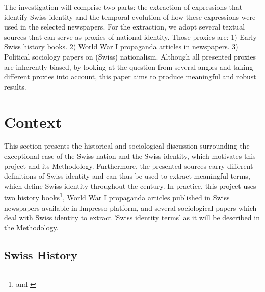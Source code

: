 \documentclass[11pt]{article}
\begin{document}
The investigation will comprise two parts: the extraction of expressions that identify Swiss identity and the temporal evolution of how these expressions were used in the selected newspapers. For the extraction, we adopt several textual sources that can serve as proxies of national identity. Those proxies are: 1) Early Swiss history books. 2) World War I propaganda articles in newspapers. 3) Political sociology papers on (Swiss) nationalism. Although all presented proxies are inherently biased, by looking at the question from several angles and taking different proxies into account, this paper aims to produce meaningful and robust results. 

\section{Context}

This section presents the historical and sociological discussion surrounding the exceptional case of the Swiss nation and the Swiss identity, which motivates this project and its Methodology. Furthermore, the presented sources carry different definitions of Swiss identity and can thus be used to extract meaningful terms, which define Swiss identity throughout the century. In practice, this project uses two history books\footnote{\cite{MuellerJohannes1780} and \cite{seippel1900schweiz}}, World War I propaganda articles published in Swiss newspapers available in Impresso platform, and several sociological papers which deal with Swiss identity to extract 'Swiss identity terms' as it will be described in the Methodology.  


\subsection{Swiss History}
\end{document}
